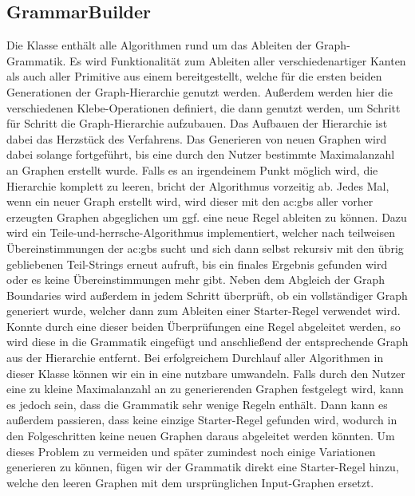 \subsection{GrammarBuilder}
Die  Klasse enthält alle Algorithmen rund um das Ableiten der Graph-Grammatik. Es wird Funktionalität zum
Ableiten aller verschiedenartiger Kanten als auch aller Primitive aus einem  bereitgestellt, welche für die ersten beiden
Generationen der Graph-Hierarchie genutzt werden. Außerdem werden hier die verschiedenen Klebe-Operationen definiert, die dann genutzt
werden, um Schritt für Schritt die Graph-Hierarchie aufzubauen. Das Aufbauen der Hierarchie ist dabei das Herzstück des Verfahrens.
Das Generieren von neuen Graphen wird dabei solange fortgeführt, bis eine durch
den Nutzer bestimmte Maximalanzahl an Graphen erstellt wurde. Falls es an irgendeinem Punkt möglich wird, die Hierarchie komplett zu leeren,
bricht der Algorithmus vorzeitig ab. Jedes Mal, wenn ein neuer Graph erstellt wird, wird dieser mit den \gls{ac:gbs} aller vorher erzeugten
Graphen abgeglichen um ggf. eine neue Regel ableiten zu können. Dazu wird ein Teile-und-herrsche-Algorithmus implementiert, welcher
nach teilweisen Übereinstimmungen der \gls{ac:gbs} sucht und sich dann selbst rekursiv mit den übrig gebliebenen Teil-Strings erneut
aufruft, bis ein finales Ergebnis gefunden wird oder es keine Übereinstimmungen mehr gibt. Neben dem Abgleich der Graph Boundaries
wird außerdem in jedem Schritt überprüft, ob ein vollständiger Graph generiert wurde, welcher dann zum Ableiten einer Starter-Regel
verwendet wird. Konnte durch eine dieser beiden Überprüfungen eine Regel abgeleitet werden, so wird diese in die Grammatik eingefügt
und anschließend der entsprechende Graph aus der Hierarchie entfernt. Bei erfolgreichem Durchlauf aller Algorithmen in dieser Klasse
können wir ein  in eine nutzbare  umwandeln. Falls durch den Nutzer eine zu kleine Maximalanzahl
an zu generierenden Graphen festgelegt wird, kann es jedoch sein, dass die Grammatik sehr wenige Regeln enthält. Dann kann es außerdem
passieren, dass keine einzige Starter-Regel gefunden wird, wodurch in den Folgeschritten keine neuen Graphen daraus abgeleitet werden
könnten. Um dieses Problem zu vermeiden und später zumindest noch einige Variationen generieren zu können, fügen wir der Grammatik
direkt eine Starter-Regel hinzu, welche den leeren Graphen mit dem ursprünglichen Input-Graphen ersetzt.

